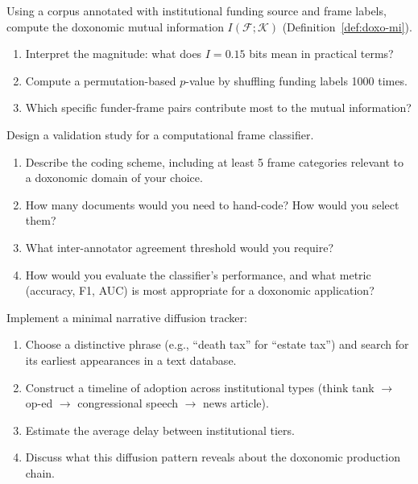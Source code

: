 \begin{exercise}
\label{ex:mi-computation}
Using a corpus annotated with institutional funding source and frame labels, compute the doxonomic mutual information $I(\mathcal{F}; \mathcal{K})$ (Definition~\ref{def:doxo-mi}).
\begin{enumerate}[nosep]
  \item Interpret the magnitude: what does $I = 0.15$ bits mean in practical terms?
  \item Compute a permutation-based $p$-value by shuffling funding labels 1000 times.
  \item Which specific funder-frame pairs contribute most to the mutual information?
\end{enumerate}
\end{exercise}

\begin{exercise}
Design a validation study for a computational frame classifier.
\begin{enumerate}[nosep]
  \item Describe the coding scheme, including at least 5 frame categories relevant to a doxonomic domain of your choice.
  \item How many documents would you need to hand-code? How would you select them?
  \item What inter-annotator agreement threshold would you require?
  \item How would you evaluate the classifier's performance, and what metric (accuracy, F1, AUC) is most appropriate for a doxonomic application?
\end{enumerate}
\end{exercise}

\begin{exercise}[Computational]
Implement a minimal narrative diffusion tracker:
\begin{enumerate}[nosep]
  \item Choose a distinctive phrase (e.g., ``death tax'' for ``estate tax'') and search for its earliest appearances in a text database.
  \item Construct a timeline of adoption across institutional types (think tank $\to$ op-ed $\to$ congressional speech $\to$ news article).
  \item Estimate the average delay between institutional tiers.
  \item Discuss what this diffusion pattern reveals about the doxonomic production chain.
\end{enumerate}
\end{exercise}
